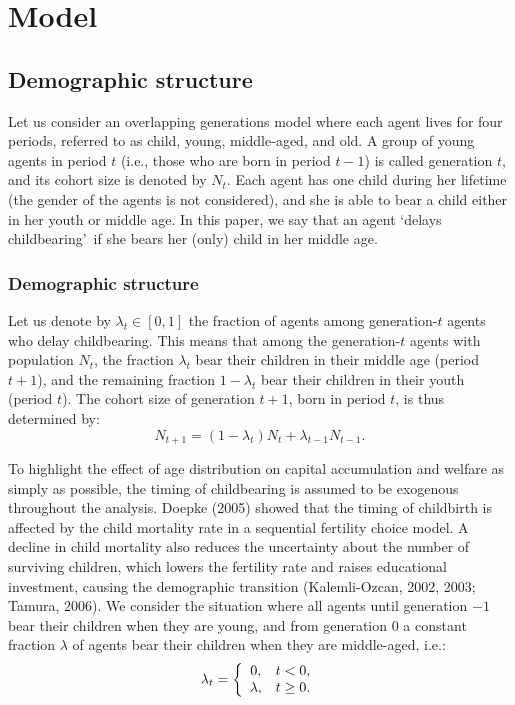 \documentclass[nogrid]{MBE}%
\begin{document}
{\section{Model\label{sec:Model}}

\subsection{Demographic structure}



Let us consider an overlapping generations model where each agent lives for
four periods, referred to as child, young, middle-aged, and old. A group of
young agents in period $t$ (i.e., those who are born in period $t-1$) is
called generation $t$, and its cohort size is denoted by $N_{t}$. Each agent
has one child during her lifetime (the gender of the agents is not
considered), and she is able to bear a child either in her youth or middle
age. In this paper, we say that an agent `delays childbearing'\ if she bears
her (only) child in her middle age.

\subsubsection{Demographic structure}

Let us denote by $\lambda_{t}\in\left[  0,1\right]  $ the fraction of agents
among generation-$t$ agents who delay childbearing. This means that among the
generation-$t$ agents with population $N_{t}$, the fraction $\lambda_{t}$ bear
their children in their middle age (period $t+1$), and the remaining fraction
$1-\lambda_{t}$ bear their children in their youth (period $t$). The cohort
size of generation $t+1$, born in period $t$, is thus determined by:%
\begin{equation}
N_{t+1}=\left(  1-\lambda_{t}\right)  N_{t}+\lambda_{t-1}N_{t-1}.
\label{eq:PopDyn}%
\end{equation}


To highlight the effect of age distribution on capital accumulation and welfare as simply as
possible, the timing of childbearing is assumed to be exogenous throughout the analysis. {Doepke
(2005) showed that the timing of childbirth is affected by the child mortality rate in a
sequential fertility choice model. A decline in child mortality also reduces the uncertainty about
the number of surviving children, which lowers the fertility rate and raises educational
investment, causing the demographic transition (Kalemli-Ozcan, 2002, 2003; Tamura, 2006).} We
consider the situation where all agents until generation $-1$ bear their children when they are
young, and from generation 0 a constant fraction $\lambda$ of agents bear their children when they
are middle-aged, i.e.:
\begin{equation}
\lambda_{t}=\left\{
\begin{array}
[c]{cc}%
0, & t<0,\\
\lambda, & t\geq0.
\end{array}
\right.  \label{eq:lambda}%
\end{equation}


}
\end{document}

